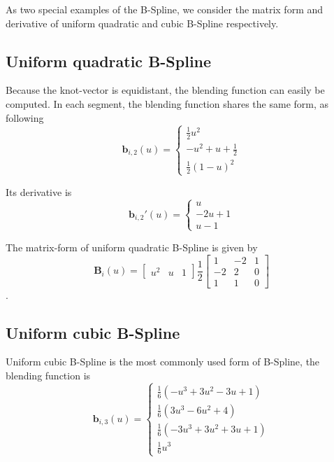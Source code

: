 As two special examples of the B-Spline, we consider the matrix form and
derivative of uniform quadratic and cubic B-Spline respectively.

\subsection{Uniform quadratic B-Spline}
\label{sec:uqb}

Because the knot-vector is equidistant, the blending function can
easily be computed. In each segment, the blending function shares the
same form, as following
\begin{equation}
  \label{eq:4.3}
  \mathbf{b}_{i,2}(u) = \begin{cases} \frac{1}{2}u^2 \\ -u^2 + u + \frac{1}{2} \\ \frac{1}{2}(1-u)^2   \end{cases}
\end{equation}

Its derivative is 
\begin{equation}
  \label{eq:4.4}
  \mathbf{b}_{i,2}'(u) = \begin{cases} u \\ -2u + 1 \\ u-1   \end{cases}
\end{equation}

The matrix-form of uniform quadratic B-Spline is given by
\begin{equation}
  \label{eq:4.5}
\mathbf{B}_i(u) = \begin{bmatrix} u^2 & u & 1 \end{bmatrix} \frac{1}{2} \begin{bmatrix}
1 & -2 & 1 \\
-2 &  2 & 0 \\
1 &  1 & 0 \end{bmatrix}
\end{equation}.

\subsection{Uniform cubic B-Spline}
\label{sec:uqb}
Uniform cubic B-Spline is the most commonly used form of B-Spline, 
the blending function is
\begin{equation}
  \label{eq:4.6}
  \mathbf{b}_{i,3}(u) = \begin{cases} \frac{1}{6}(-u^3+3u^2-3u+1) \\
    \frac{1}{6}(3u^3 -6u^2+4)\\ \frac{1}{6}(-3u^3+3u^2+3u+1) \\
    \frac{1}{6}u^3
   \end{cases}
\end{equation}

